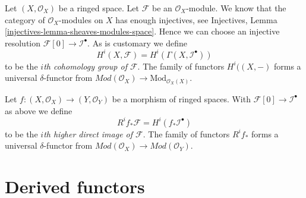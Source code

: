 \medskip\noindent
Let $(X, \mathcal{O}_X)$ be a ringed space. Let $\mathcal{F}$ be an
$\mathcal{O}_X$-module. We know that the category of $\mathcal{O}_X$-modules
on $X$ has enough injectives, see
Injectives, Lemma \ref{injectives-lemma-sheaves-modules-space}.
Hence we can choose an injective resolution
$\mathcal{F}[0] \to \mathcal{I}^\bullet$. As is customary we define
\begin{equation}
\label{equation-cohomology-modules}
H^i(X, \mathcal{F}) = H^i(\Gamma(X, \mathcal{I}^\bullet))
\end{equation}
to be the {\it $i$th cohomology group of $\mathcal{F}$}.
The family of functors $H^i((X, -)$ forms a universal $\delta$-functor
from $\textit{Mod}(\mathcal{O}_X) \to \text{Mod}_{\mathcal{O}_X(X)}$.

\medskip\noindent
Let $f : (X, \mathcal{O}_X) \to (Y, \mathcal{O}_Y)$ be a morphism of ringed
spaces. With $\mathcal{F}[0] \to \mathcal{I}^\bullet$ as above
we define
\begin{equation}
\label{equation-higher-direct-image-modules}
R^if_*\mathcal{F} = H^i(f_*\mathcal{I}^\bullet)
\end{equation}
to be the {\it $i$th higher direct image of $\mathcal{F}$}.
The family of functors $R^if_*$ forms a universal $\delta$-functor
from $\textit{Mod}(\mathcal{O}_X) \to \textit{Mod}(\mathcal{O}_Y)$.





\section{Derived functors}
\label{section-derived-functors}

